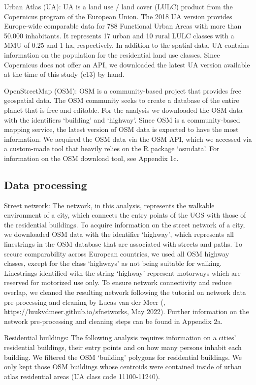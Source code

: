 \documentclass[10pt]{article}
\begin{document}
Urban Atlas (UA): UA is a land use / land cover (LULC) product from the Copernicus program of the European Union.
The 2018 UA version provides Europe-wide comparable data for 788 Functional Urban Areas with more than 50.000 inhabitants.
It represents 17 urban and 10 rural LULC classes with a MMU of 0.25 and 1 ha, respectively.
In addition to the spatial data, UA contains information on the population for the residential land use classes.
Since Copernicus does not offer an API, we downloaded the latest UA version available at the time of this study (c13) by hand.

OpenStreetMap (OSM): OSM is a community-based project that provides free geospatial data.
The OSM community seeks to create a database of the entire planet that is free and editable.
For the analysis we downloaded the OSM data with the identifiers ‘building’ and ‘highway’.
Since OSM is a community-based mapping service, the latest version of OSM data is expected to have the most information.
We acquired the OSM data via the OSM API, which we accessed via a custom-made tool that heavily relies on the R package ‘osmdata’.
For information on the OSM download tool, see Appendix 1c.

\subsection{Data processing}
Street network: The network, in this analysis, represents the walkable environment of a city, which connects the entry points of the UGS with those of the residential buildings.
To acquire information on the street network of a city, we downloaded OSM data with the identifier ‘highway’, which represents all linestrings in the OSM database that are associated with streets and paths.
To secure comparability across European countries, we used all OSM highway classes, except for the class ‘highways’ as not being suitable for walking.
Linestrings identified with the string ‘highway’ represent motorways which are reserved for motorized use only.
To ensure network connectivity and reduce overlap, we cleaned the resulting network following the tutorial on network data pre-processing and cleaning by Lucas van der Meer (\cite{vanderMeer.2019}, https://luukvdmeer.github.io/sfnetworks, May 2022).
Further information on the network pre-processing and cleaning steps can be found in Appendix 2a.

Residential buildings: The following analysis requires information on a cities’ residential buildings, their entry points and on how many persons inhabit each building.
We filtered the OSM ‘building’ polygons for residential buildings.
We only kept those OSM buildings whose centroids were contained inside of urban atlas residential areas (UA class code 11100-11240).
\end{document}
